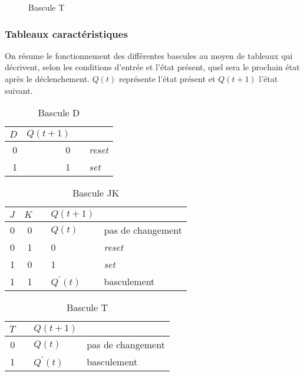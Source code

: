 \documentclass[11pt]{article}
\begin{document}
\begin{figure}[htbp]
\centering

\caption{\label{fig:org944edc8}Bascule T}
\end{figure}

\subsubsection{Tableaux caractéristiques}
\label{sec:org7bfe516}

On résume le fonctionnement des différentes bascules au moyen de
tableaux qui décrivent, selon les conditions d'entrée et l'état
présent, quel sera le prochain état après le déclenchement. \(Q(t)\)
représente l'état présent et \(Q(t+1)\) l'état suivant.

\begin{table}[htbp]
\caption{\label{tab:org0061a4b}Bascule D}
\centering
\begin{tabular}{rrll}
\(D\) & \(Q(t+1)\) &  & \\
\hline
0 & 0 &  & \emph{reset}\\
1 & 1 &  & \emph{set}\\
\end{tabular}
\end{table}

\begin{table}[htbp]
\caption{\label{tab:org973196b}Bascule JK}
\centering
\begin{tabular}{rrlll}
\(J\) & \(K\) &  & \(Q(t+1)\) & \\
\hline
0 & 0 &  & \(Q(t)\) & pas de changement\\
0 & 1 &  & 0 & \emph{reset}\\
1 & 0 &  & 1 & \emph{set}\\
1 & 1 &  & \(Q^\prime(t)\) & basculement\\
\end{tabular}
\end{table}

\begin{table}[htbp]
\caption{\label{tab:org46ab883}Bascule T}
\centering
\begin{tabular}{rlll}
\(T\) &  & \(Q(t+1)\) & \\
\hline
0 &  & \(Q(t)\) & pas de changement\\
1 &  & \(Q^\prime(t)\) & basculement\\
\end{tabular}
\end{table}
\end{document}
